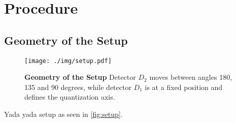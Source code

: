 \chapter{Procedure}

\section{Geometry of the Setup}
\begin{figure}[tbp]
	\centering
	\texttt{[image: ./img/setup.pdf]}
	\caption[Geometry of the Setup]{\textbf{Geometry of the Setup} Detector $D_2$ moves between angles 180, 135 and 90 degrees, while detector $D_1$ is at a fixed position and defines the quantization axis.}
	\label{fig:setup}
\end{figure}
Yada yada setup as seen in \autoref{fig:setup}.
